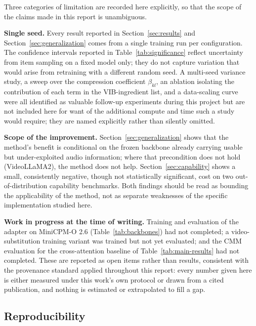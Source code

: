 \documentclass[11pt,a4paper,oneside]{article}
\begin{document}
Three categories of limitation are recorded here explicitly, so that the scope of the claims made in
this report is unambiguous.

\textbf{Single seed.} Every result reported in Section~\ref{sec:results} and
Section~\ref{sec:generalization} comes from a single training run per configuration. The confidence
intervals reported in Table~\ref{tab:significance} reflect uncertainty from item sampling on a fixed
model only; they do not capture variation that would arise from retraining with a different random
seed. A multi-seed variance study, a sweep over the compression coefficient $\beta_{kl}$, an ablation
isolating the contribution of each term in the VIB-ingredient list, and a data-scaling curve were all
identified as valuable follow-up experiments during this project but are not included here for want
of the additional compute and time such a study would require; they are named explicitly rather than
silently omitted.

\textbf{Scope of the improvement.} Section~\ref{sec:generalization} shows that the method's benefit
is conditional on the frozen backbone already carrying usable but under-exploited audio information;
where that precondition does not hold (VideoLLaMA2), the method does not help.
Section~\ref{sec:capability} shows a small, consistently negative, though not
statistically significant, cost on two out-of-distribution capability benchmarks. Both findings
should be read as bounding the applicability of the method, not as separate weaknesses of the specific
implementation studied here.

\textbf{Work in progress at the time of writing.} Training and evaluation of the adapter on MiniCPM-O
2.6 (Table~\ref{tab:backbones}) had not completed; a video-substitution training variant was trained
but not yet evaluated; and the CMM evaluation for the cross-attention baseline of
Table~\ref{tab:main-results} had not completed. These are reported as open items rather than
results, consistent with the provenance
standard applied throughout this report: every number given here is either measured under this
work's own protocol or drawn from a cited publication, and nothing is estimated or extrapolated to
fill a gap.

\subsection{Reproducibility}
\label{sec:reproducibility}
\end{document}
